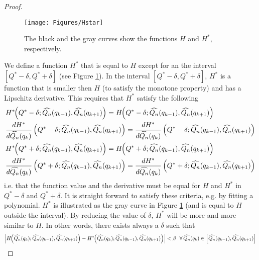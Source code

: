 \documentclass[10pt, a4paper]{article}
\newtheorem{rational for conjecture}{Rational for Conjecture}
\begin{document}
\begin{proof}
  \begin{figure}
    \centering
    \texttt{[image: Figures/Hstar]}
    \caption{The black and the gray curves show the functions $H$ and $H^{\ast}$, respectively.}
    \label{fig:1}
  \end{figure}
We define a function $H^{\ast}$ that is equal to $H$ except for an the interval $[Q^{\ast} - \delta, Q^{\ast} + \delta]$ (see Figure \ref{fig:1}). In the interval $[Q^{\ast} - \delta, Q^{\ast} + \delta]$, $H^{\ast}$ is a function that is smaller then $H$ (to satisfy the monotone property) and has a Lipschitz derivative. This requires that $H^{\ast}$ satisfy the following
\begin{align*}
  &H^{\ast}\hspace{-1mm}\left(Q^{\ast} - \delta; \widehat{Q_{n}}(q_{k-1}), \widehat{Q_{n}}(q_{k+1}) \right) = H\hspace{-1mm}\left(Q^{\ast} - \delta; \widehat{Q_{n}}(q_{k-1}), \widehat{Q_{n}}(q_{k+1}) \right) \\
  &\frac{d H^{\ast}}{d \widehat{Q_{n}}(q_{k})} \left(Q^{\ast} - \delta; \widehat{Q_{n}}(q_{k-1}), \widehat{Q_{n}}(q_{k+1}) \right) = \frac{d H^{\ast}}{d \widehat{Q_{n}}(q_{k})} \left(Q^{\ast} - \delta; \widehat{Q_{n}}(q_{k-1}), \widehat{Q_{n}}(q_{k+1}) \right) \\
  &H^{\ast}\hspace{-1mm}\left(Q^{\ast} + \delta; \widehat{Q_{n}}(q_{k-1}), \widehat{Q_{n}}(q_{k+1}) \right) = H\hspace{-1mm}\left(Q^{\ast} + \delta; \widehat{Q_{n}}(q_{k-1}), \widehat{Q_{n}}(q_{k+1}) \right) \\
  &\frac{d H^{\ast}}{d \widehat{Q_{n}}(q_{k})} \left(Q^{\ast} + \delta; \widehat{Q_{n}}(q_{k-1}), \widehat{Q_{n}}(q_{k+1}) \right) = \frac{d H^{\ast}}{d \widehat{Q_{n}}(q_{k})} \left(Q^{\ast} + \delta; \widehat{Q_{n}}(q_{k-1}), \widehat{Q_{n}}(q_{k+1}) \right)
\end{align*}
i.e. that the function value and the derivative must be equal for $H$ and $H^{\ast}$ in $Q^{\ast} - \delta$ and $Q^{\ast} + \delta$. It is straight forward to satisfy these criteria, e.g. by fitting a polynomial. $H^{\ast}$ is illustrated as the gray curve in Figure \ref{fig:1} (and is equal to $H$ outside the interval). By reducing the value of $\delta$, $H^{\ast}$ will be more and more similar to $H$. In other words, there exists always a $\delta$ such that
\begin{align*}
\left| H\hspace{-1mm}\left(\widehat{Q_{n}}(q_{k}); \widehat{Q_{n}}(q_{k-1}), \widehat{Q_{n}}(q_{k+1}) \right) - H^{\ast}\hspace{-1mm}\left(\widehat{Q_{n}}(q_{k}); \widehat{Q_{n}}(q_{k-1}), \widehat{Q_{n}}(q_{k+1}) \right)\right| < \beta \,\,\,\, \forall\,\widehat{Q_{n}}(q_{k}) \in \left[\widehat{Q_{n}}(q_{k-1}), \widehat{Q_{n}}(q_{k+1}) \right]

\end{align*}
\end{proof}
\end{document}
